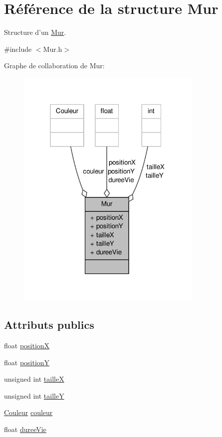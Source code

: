 \hypertarget{structMur}{\section{Référence de la structure Mur}
\label{structMur}
}


Structure d'un \hyperlink{structMur}{Mur}.  




{\ttfamily \#include $<$Mur.\-h$>$}



Graphe de collaboration de Mur\-:
\nopagebreak
\begin{figure}[H]
\begin{center}
\leavevmode
\includegraphics[width=253pt]{structMur__coll__graph}
\end{center}
\end{figure}
\subsection*{Attributs publics}
\begin{DoxyCompactItemize}
\item 
float \hyperlink{structMur_affc832d25c091c05a2ab0340a38e8617}{position\-X}
\item 
float \hyperlink{structMur_a5cb3e3d2e2f71120f6746772a44a0980}{position\-Y}
\item 
unsigned int \hyperlink{structMur_a83d5a0639f49e58cfb805a91702d6701}{taille\-X}
\item 
unsigned int \hyperlink{structMur_ad0c6b841ae4069d6b4e6559d7e88cf47}{taille\-Y}
\item 
\hyperlink{Couleur_8h_aa304d0ca681f782b1d7735da33037dd7}{Couleur} \hyperlink{structMur_adfb47de65971e21c8b3012cfcf7cab28}{couleur}
\item 
float \hyperlink{structMur_a7b0f44b48d4a8408e1adeb057ad201f8}{duree\-Vie}
\end{DoxyCompactItemize}



